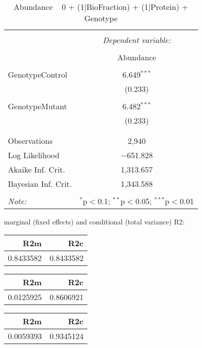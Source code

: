 \documentclass[11pt]{report}
\begin{document}
\begin{table}[!htbp] \centering 
  \caption{Abundance ~ 0 + (1|BioFraction) + (1|Protein) + Genotype} 
  \label{} 
\begin{tabular}{@{\extracolsep{5pt}}lc} 
\\[-1.8ex]\hline 
\hline \\[-1.8ex] 
 & \multicolumn{1}{c}{\textit{Dependent variable:}} \\ 
\cline{2-2} 
\\[-1.8ex] & Abundance \\ 
\hline \\[-1.8ex] 
 GenotypeControl & 6.649$^{***}$ \\ 
  & (0.233) \\ 
  & \\ 
 GenotypeMutant & 6.482$^{***}$ \\ 
  & (0.233) \\ 
  & \\ 
\hline \\[-1.8ex] 
Observations & 2,940 \\ 
Log Likelihood & $-$651.828 \\ 
Akaike Inf. Crit. & 1,313.657 \\ 
Bayesian Inf. Crit. & 1,343.588 \\ 
\hline 
\hline \\[-1.8ex] 
\textit{Note:}  & \multicolumn{1}{r}{$^{*}$p$<$0.1; $^{**}$p$<$0.05; $^{***}$p$<$0.01} \\ 
\end{tabular} 
\end{table} 
marginal (fixed effects) and conditional (total variance) R2:

\begin{tabular}{r|r}
\hline
R2m & R2c\\
\hline
0.8433582 & 0.8433582\\
\hline
\end{tabular}

\begin{tabular}{r|r}
\hline
R2m & R2c\\
\hline
0.0125925 & 0.8606921\\
\hline
\end{tabular}

\begin{tabular}{r|r}
\hline
R2m & R2c\\
\hline
0.0059393 & 0.9345124\\
\hline
\end{tabular}
\end{document}
